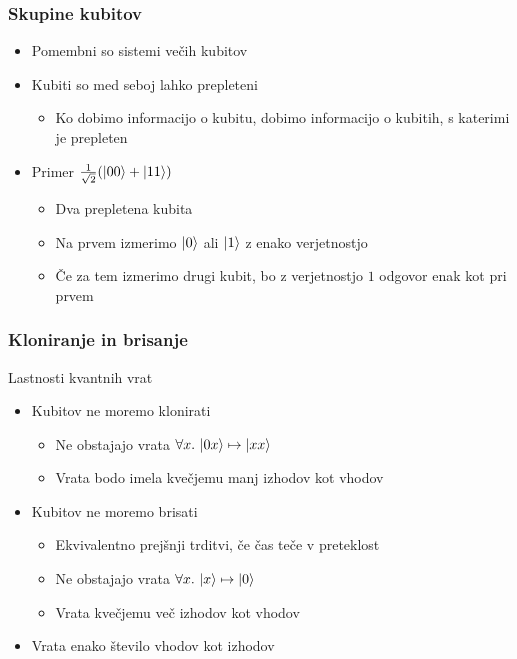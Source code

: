 \documentclass[10pt]{beamer}
\begin{document}
\begin{frame}
  \frametitle{Skupine kubitov}
  \begin{itemize}
  \item Pomembni so sistemi večih kubitov
  \item Kubiti so med seboj lahko prepleteni
    \begin{itemize}
    \item Ko dobimo informacijo o kubitu, dobimo informacijo o kubitih, s katerimi je prepleten
    \end{itemize}\pause
  \item Primer \(\frac1{\sqrt2}(\ket{00}+\ket{11})\)
    \begin{itemize}
    \item Dva prepletena kubita\pause
    \item Na prvem izmerimo \(\ket0\) ali \(\ket1\) z enako verjetnostjo
    \item Če za tem izmerimo drugi kubit, bo z verjetnostjo \(1\) odgovor enak kot pri prvem
    \end{itemize}
  \end{itemize}
\end{frame}
\begin{frame}
  \frametitle{Kloniranje in brisanje}
  Lastnosti kvantnih vrat
  \begin{itemize}
  \item Kubitov ne moremo klonirati
    \begin{itemize}
    \item Ne obstajajo vrata \(\forall x.\, \ket{0x}\mapsto\ket{xx}\)
    \item Vrata bodo imela kvečjemu manj izhodov kot vhodov
    \end{itemize}\pause
  \item Kubitov ne moremo brisati
    \begin{itemize}
    \item Ekvivalentno prejšnji trditvi, če čas teče v preteklost
    \item Ne obstajajo vrata \(\forall x.\, \ket x\mapsto\ket0\)
    \item Vrata kvečjemu več izhodov kot vhodov
    \end{itemize}\pause
  \item Vrata enako število vhodov kot izhodov
  \end{itemize}
\end{frame}
\end{document}

